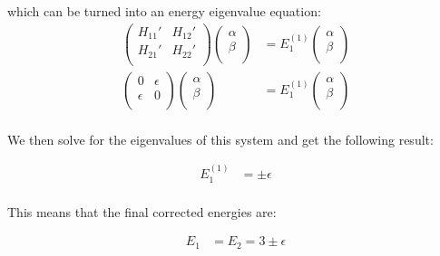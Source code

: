 \documentclass[10pt]{article} %
\begin{document}
which can be turned into an energy eigenvalue equation:\\

\begin{align*}
  \begin{pmatrix}
    H_{11}' & H_{12}'\\
    H_{21}' & H_{22}'\\
  \end{pmatrix}
  \begin{pmatrix}
    \alpha\\
    \beta\\
  \end{pmatrix}
  &=
  E_1^{(1)}
  \begin{pmatrix}
    \alpha\\
    \beta\\
  \end{pmatrix}\\
  \begin{pmatrix}
    0 & \epsilon\\
    \epsilon & 0\\
  \end{pmatrix}
  \begin{pmatrix}
    \alpha\\
    \beta\\
  \end{pmatrix}
  &=
  E_1^{(1)}
  \begin{pmatrix}
    \alpha\\
    \beta\\
  \end{pmatrix}\\
\end{align*}

We then solve for the eigenvalues of this system and get the following result:

\begin{align*}
  E_1^{(1)} &= \pm \epsilon\\
\end{align*}

This means that the final corrected energies are:

\begin{align*}
  E_1 &= E_2 = 3 \pm \epsilon\\
\end{align*}
\end{document}
